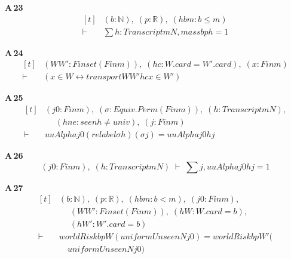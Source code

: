 \noindent\textbf{A\,23}\quad{}
{\footnotesize\[ \begin{aligned}[t]
&(\mathit{b} : \mathbb{N} ),\; (\mathit{p} : \mathbb{R} ),\; (\mathit{hbm} : \mathit{b} \leq \mathit{m})\\
\vdash\;&\textstyle\sum \mathit{h} : \mathit{Transcript} \mathit{m} \mathit{N}, \mathit{mass} \mathit{b} \mathit{p} \mathit{h} = 1
\end{aligned} \]}

\noindent\textbf{A\,24}\quad{}
{\footnotesize\[ \begin{aligned}[t]
&(\mathit{W} \mathit{W'} : \mathit{Finset} (\mathit{Fin} \mathit{m})),\; (\mathit{hc} : \mathit{W}.\mathit{card} = \mathit{W'}.\mathit{card}),\; (\mathit{x} : \mathit{Fin} \mathit{m})\\
\vdash\;&(\mathit{x} \in \mathit{W} \leftrightarrow \mathit{transport} \mathit{W} \mathit{W'} \mathit{hc} \mathit{x} \in \mathit{W'})
\end{aligned} \]}

\noindent\textbf{A\,25}\quad{}
{\footnotesize\[ \begin{aligned}[t]
&(\mathit{j0} : \mathit{Fin} \mathit{m}),\; (\sigma : \mathit{Equiv}.\mathit{Perm} (\mathit{Fin} \mathit{m})),\; (\mathit{h} : \mathit{Transcript} \mathit{m} \mathit{N}),\\
&\quad \; (\mathit{hne} : \mathit{seen} \mathit{h} \neq \mathit{univ}),\; (\mathit{j} : \mathit{Fin} \mathit{m})\\
\vdash\;&\mathit{uuAlpha} \mathit{j0} (\mathit{relabel} \sigma \mathit{h}) (\sigma \mathit{j}) = \mathit{uuAlpha} \mathit{j0} \mathit{h} \mathit{j}
\end{aligned} \]}

\noindent\textbf{A\,26}\quad{}
{\footnotesize\[ (\mathit{j0} : \mathit{Fin} \mathit{m}),\; (\mathit{h} : \mathit{Transcript} \mathit{m} \mathit{N}) \;\vdash\; \textstyle\sum \mathit{j}, \mathit{uuAlpha} \mathit{j0} \mathit{h} \mathit{j} = 1 \]}

\noindent\textbf{A\,27}\quad{}
{\footnotesize\[ \begin{aligned}[t]
&(\mathit{b} : \mathbb{N} ),\; (\mathit{p} : \mathbb{R} ),\; (\mathit{hbm} : \mathit{b} < \mathit{m}),\; (\mathit{j0} : \mathit{Fin} \mathit{m}),\\
&\quad \; (\mathit{W} \mathit{W'} : \mathit{Finset} (\mathit{Fin} \mathit{m})),\; (\mathit{hW} : \mathit{W}.\mathit{card} = \mathit{b}),\\
&\quad \; (\mathit{hW'} : \mathit{W'}.\mathit{card} = \mathit{b})\\
\vdash\;&\mathit{worldRisk} \mathit{b} \mathit{p} \mathit{W} (\mathit{uniformUnseen} \mathit{N} \mathit{j0}) = \mathit{worldRisk} \mathit{b} \mathit{p} \mathit{W'} (\\
&\quad \mathit{uniformUnseen} \mathit{N} \mathit{j0})
\end{aligned} \]}

